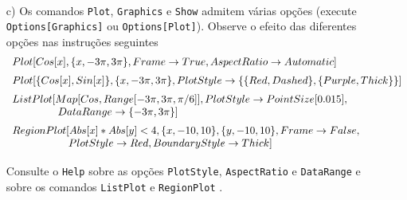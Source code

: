 \documentclass[11pt]{article}
\begin{document}
\begin{itemize}
\[\begin{array}{l}
 
  \end{array}
\]


 
     \item[c)]  Os comandos \texttt{Plot}, \texttt{Graphics} e \texttt{Show} admitem v\'arias op\c{c}\~oes  (execute   
 \texttt{Options[Graphics]} ou \texttt{Options[Plot]}).  Observe o efeito das diferentes  op\c{c}\~oes  nas instru\c{c}\~oes seguintes 
   \[\begin{array}{l}
 Plot[Cos[x], \{x, -3 \pi, 3 \pi\}, Frame \rightarrow True, AspectRatio \rightarrow Automatic]
     
     
         \vspace{2mm}
\\

Plot[\{Cos[x], Sin[x]\}, \{x, -3 \pi, 3 \pi \}, 
 PlotStyle \rightarrow \{\{Red, Dashed\}, \{Purple, Thick\}\}]
 
          \vspace{2mm}
\\

ListPlot[Map[Cos, Range[-3 \pi, 3 \pi, \pi/6]], 
 PlotStyle \rightarrow PointSize[0.015], 
  \\ 
\qquad \qquad  \ DataRange \rightarrow \{-3 \pi, 3 \pi \}]
 
          \vspace{2mm}
\\

 
 RegionPlot[Abs[x]\ast Abs[y] < 4, \{x, -10, 10\}, \{y, -10, 10\}, 
 Frame \rightarrow False,    \\ 
\qquad \qquad \quad \
PlotStyle \rightarrow Red, 
 BoundaryStyle \rightarrow Thick]
 
         \vspace{2mm}
\\

 \end{array}
\]
Consulte o \texttt{Help} sobre as op\c{c}\~oes \texttt{PlotStyle}, \texttt{AspectRatio} e \texttt{DataRange} e sobre os comandos \texttt{ListPlot} e \texttt{RegionPlot} .  
 

\end{itemize}
\end{document}
